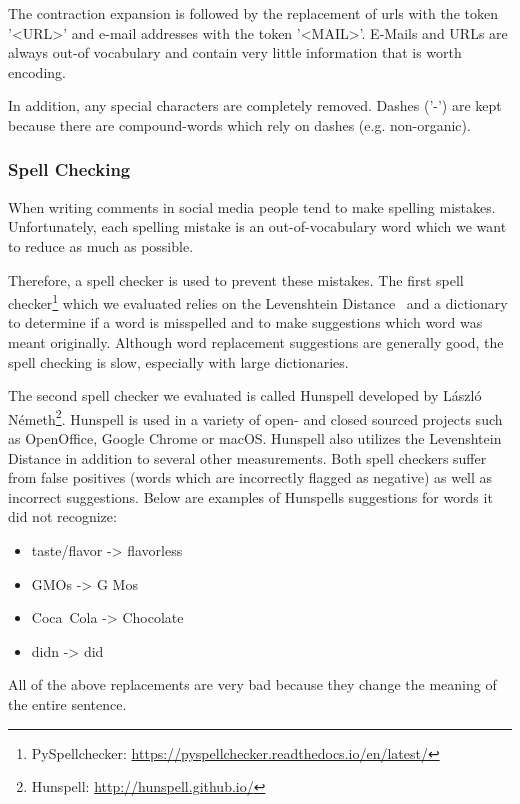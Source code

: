The contraction expansion is followed by the replacement of \glspl{url} with the token '<URL>' and e-mail addresses with the token '<MAIL>'. E-Mails and URLs are always out-of vocabulary and contain very little information that is worth encoding. 
\medskip

In addition, any special characters are completely removed. Dashes ('-') are kept because there are compound-words which rely on dashes (e.g. non-organic).

\subsubsection*{Spell Checking}
\label{sec:05_SpellChecking}
When writing comments in social media people tend to make spelling mistakes. Unfortunately, each spelling mistake is an out-of-vocabulary word which we want to reduce as much as possible.

Therefore, a spell checker is used to prevent these mistakes. The first spell checker\footnote{PySpellchecker: \url{https://pyspellchecker.readthedocs.io/en/latest/}} which we evaluated relies on the Levenshtein Distance~\cite{Levenshtein1966} and a dictionary to determine if a word is misspelled and to make suggestions which word was meant originally. Although word replacement suggestions are generally good, the spell checking is slow, especially with large dictionaries.
\medskip

The second spell checker we evaluated is called Hunspell developed by László Németh\footnote{Hunspell: \hyperlink{http://hunspell.github.io/}{http://hunspell.github.io/}}. Hunspell is used in a variety of open- and closed sourced projects such as OpenOffice, Google Chrome or macOS. Hunspell also utilizes the Levenshtein Distance in addition to several other measurements. Both spell checkers suffer from false positives {(words which are incorrectly flagged as negative)} as well as incorrect suggestions. Below are examples of Hunspells suggestions for words it did not recognize:

\begin{itemize}
    \item taste/flavor -> flavorless
    \item GMOs -> G Mos
    \item Coca~Cola -> Chocolate
    \item didn -> did
\end{itemize}

All of the above replacements are very bad because they change the meaning of the entire sentence.

